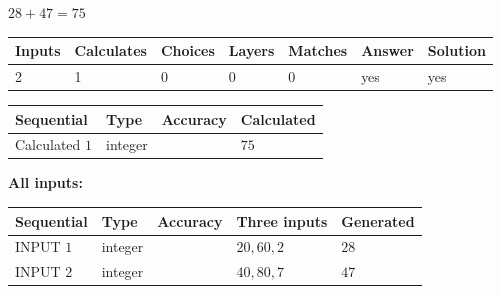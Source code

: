 \documentclass[12pt]{article}
\begin{document}
 
\noindent{}
 
 

$ %
28 +  %
47=   %
75$
 
 
\noindent{}
 
 

 
   
   
   
   
\noindent\begin{tabular}{|l|l|l|l|l|l|l|}
 \hline
Inputs & Calculates & Choices & Layers & Matches & Answer & Solution \\ \hline
 2  & 
 1  & 
 0
  & 
 0  & 
 0  & 
  yes & 
  yes 
  \\ \hline
 \end{tabular}
   
   
   
   
\noindent{}
   
   
  
  
\noindent\begin{tabular}{|l|l|l|l|}
\hline
 Sequential & Type & Accuracy & Calculated \\ 
\hline
 
 
  Calculated $  1 $ & integer &  & 
  $ 75 $ 
 \\  \hline  
 \end{tabular}
   
   
   
   
\noindent\vspace{0.1in}\hspace{-0.08in} {\textbf{\Large{All inputs: }}}
   
   
  
  
\noindent\begin{tabular}{|l|l|l|l|l|}
\hline
 Sequential & Type & Accuracy & Three inputs & Generated \\ 
\hline
 
 
  INPUT $  1 $ & integer &  & $
 20
 , 
 60
 , 
 2
 $ & $ 28 $ 
 \\  \hline  
 
 
  INPUT $  2 $ & integer &  & $
 40
 , 
 80
 , 
 7
 $ & $ 47 $ 
 \\  \hline  
 \end{tabular}
   
   
  
\end{document}
